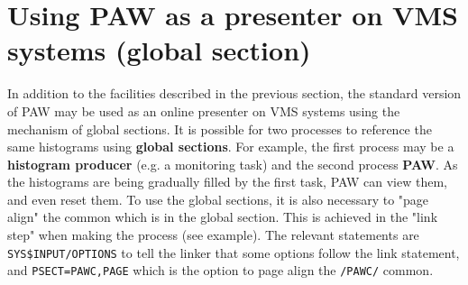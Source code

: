 \newpage

\section{Using PAW as a presenter on VMS systems (global section)}
 
 
In addition to the facilities described in the previous section,
the standard version of PAW may be used as an online presenter
on VMS systems using the mechanism of global sections.
It is possible for two processes to reference the same histograms
using {\bf global sections}.
For example, the first process may be a {\bf histogram producer}
(e.g. a monitoring task) and the second process  {\bf PAW}.
As the
histograms are being gradually filled by the first task, PAW can
view them, and even reset them.
To use the global sections, it is also necessary to "page align" the common
which is in the global section. This is achieved in the "link step" when making
the process (see example).
The relevant statements are \texttt{SYS\$INPUT/OPTIONS}
to tell the linker that some options follow the link statement,
and \texttt{PSECT=PAWC,PAGE} which is the option to
page align the \texttt{/PAWC/} common.
 
